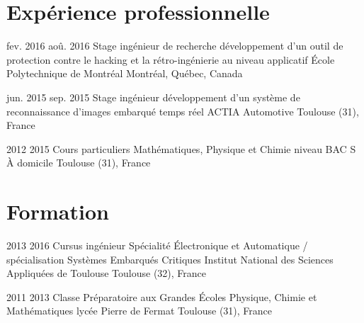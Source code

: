 \documentclass{custom_cv}
\begin{document}
\section{Expérience professionnelle}
\begin{Experience}
    \Item
    {fev. 2016}
    {aoû. 2016}
    {Stage ingénieur de recherche}
    {développement d'un outil de protection contre le hacking et la rétro-ingénierie au niveau applicatif}
    {École Polytechnique de Montréal}
    {Montréal, Québec, Canada}

    \Item
    {jun. 2015}
    {sep. 2015}
    {Stage ingénieur}
    {développement d'un système de reconnaissance d'images embarqué temps réel}
    {ACTIA Automotive}
    {Toulouse (31), France}

    \Item
    {2012}
    {2015}
    {Cours particuliers}
    {Mathématiques, Physique et Chimie niveau BAC S}
    {À domicile}
    {Toulouse (31), France}  
\end{Experience}

\section{Formation}
\begin{Experience}
    \Item
    {2013}
    {2016}
    {Cursus ingénieur}
    {Spécialité Électronique et Automatique / spécialisation Systèmes Embarqués Critiques}
    {Institut National des Sciences Appliquées de Toulouse}
    {Toulouse (32), France}

    \Item
    {2011}
    {2013}
    {Classe Préparatoire aux Grandes Écoles}
    {Physique, Chimie et Mathématiques}
    {lycée Pierre de Fermat}
    {Toulouse (31), France}
\end{Experience}
\end{document}
